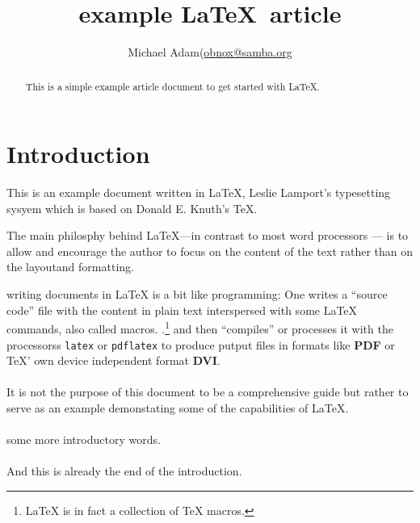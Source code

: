 \documentclass{article}
\title{example \LaTeX\ article}
\author{Michael Adam(\href{mailto:obnox@samba.org}{obnox@samba.org}}
\begin{document}
\maketitle

\begin{abstract}

    This is a simple  example article document to get started with  {\LaTeX}.

\end{abstract}

\tableofcontents

\section*{Introduction}

This is an example document written in {\LaTeX}, Leslie Lamport's typesetting
sysyem which is based on Donald E. Knuth's {\TeX}.

The main philosphy behind {\LaTeX}---in contrast to most word processors --- is to allow and encourage the author to
focus on the content of the text rather than on the layoutand formatting.

writing documents in {\LaTeX} is a bit like programming: One writes a ``source code''  file with the content in plain text
interspersed with some {\LaTeX} commands, also called macros. .\footnote{{\LaTeX} is in fact a collection of {\TeX} macros.}\label{fn:macros}
and then ``compiles'' or processes it with the processorss \verb|latex| or \verb|pdflatex| to produce
putput files in formats like \textbf{PDF} or {\TeX}' own device independent format \textbf{DVI}.

\paragraph{} It is not the purpose of this document to be a comprehensive guide but rather to serve as an example demonstating some of the capabilities of  {\LaTeX}.


\paragraph{} some more introductory words.

\paragraph{} And this is already the end of the introduction.
\end{document}
